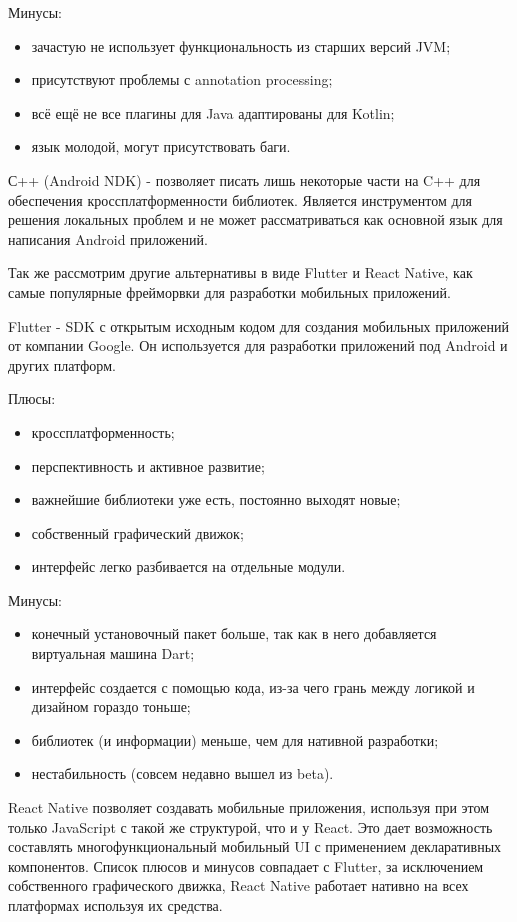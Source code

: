 Минусы:
\begin{itemize}
 \item зачастую не использует функциональность из старших версий JVM;
 \item присутствуют проблемы с annotation processing;
 \item всё ещё не все плагины для Java адаптированы для Kotlin;
 \item язык молодой, могут присутствовать баги.
\end{itemize}

С++ (Android NDK) - позволяет писать лишь некоторые части на C++ для обеспечения кроссплатформенности библиотек. Является инструментом для решения локальных проблем и не может рассматриваться как основной язык для написания Android приложений.

Так же рассмотрим другие альтернативы в виде Flutter и React Native, как самые популярные фрейморвки для разработки мобильных приложений.

Flutter - SDK с открытым исходным кодом для создания мобильных приложений от компании Google. Он используется для разработки приложений под Android и других платформ.

Плюсы:
\begin{itemize}
 \item кроссплатформенность;
 \item перспективность и активное развитие;
 \item важнейшие библиотеки уже есть, постоянно выходят новые;
 \item собственный графический движок;
 \item интерфейс легко разбивается на отдельные модули.
\end{itemize}

Минусы:
\begin{itemize}
 \item конечный установочный пакет больше, так как в него добавляется виртуальная машина Dart;
 \item интерфейс создается с помощью кода, из-за чего грань между логикой и дизайном гораздо тоньше;
 \item библиотек (и информации) меньше, чем для нативной разработки;
 \item нестабильность (совсем недавно вышел из beta).
\end{itemize}


React Native позволяет создавать мобильные приложения, используя при этом только JavaScript с такой же структурой, что и у React. Это дает возможность составлять многофункциональный мобильный UI с применением декларативных компонентов. Список плюсов и минусов совпадает с Flutter, за исключением собственного графического движка, React Native работает нативно на всех платформах используя их средства.


